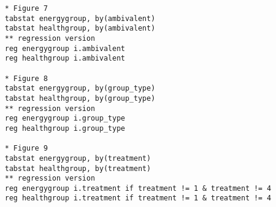 \documentclass[a4paper]{exam}
\begin{document}
\begin{verbatim}
* Figure 7
tabstat energygroup, by(ambivalent)
tabstat healthgroup, by(ambivalent)
** regression version
reg energygroup i.ambivalent
reg healthgroup i.ambivalent

* Figure 8
tabstat energygroup, by(group_type)
tabstat healthgroup, by(group_type)
** regression version
reg energygroup i.group_type
reg healthgroup i.group_type

* Figure 9
tabstat energygroup, by(treatment)
tabstat healthgroup, by(treatment)
** regression version
reg energygroup i.treatment if treatment != 1 & treatment != 4
reg healthgroup i.treatment if treatment != 1 & treatment != 4
\end{verbatim}
\end{document}
